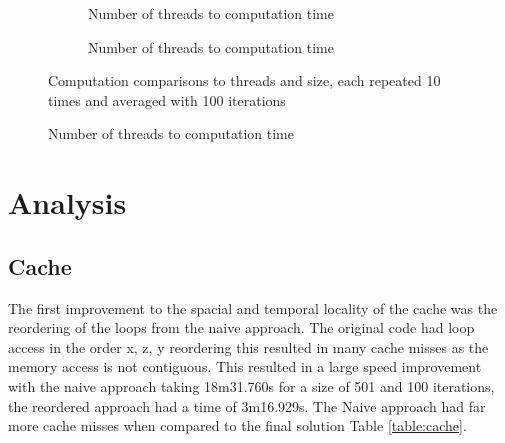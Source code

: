 \documentclass[12pt]{article}
\begin{document}
\begin{figure}[H]
    
\end{figure}

\begin{figure}
    \centering
    \begin{subfigure}[b]{0.48\textwidth}
        \begin{adjustbox}{width=\textwidth}
        
        \end{adjustbox}
        \caption{Number of threads to computation time}
        \label{fig:st}
    \end{subfigure}
    \begin{subfigure}[b]{0.48\textwidth}
        \begin{adjustbox}{width=\textwidth}
        
        \end{adjustbox}
        \caption{Number of threads to computation time}
        \label{fig:tt}
    \end{subfigure}
    \caption{Computation comparisons to threads and size, each repeated 10 times and averaged with 100 iterations}
\end{figure}


\begin{figure}[H]
    \centering
    
    \caption{Number of threads to computation time}
\end{figure}


\section{Analysis}

\subsection{Cache}
The first improvement to the spacial and temporal locality of the cache was the reordering of the loops from the naive approach.
The original code had loop access in the order x, z, y reordering this resulted in many cache misses as the memory access is not contiguous.
This resulted in a large speed improvement with the naive approach taking 18m31.760s for a size of 501 and 100 iterations, the reordered approach
had a time of 3m16.929s. The Naive approach had far more cache misses when compared to the final solution Table \ref{table:cache}.
\end{document}
